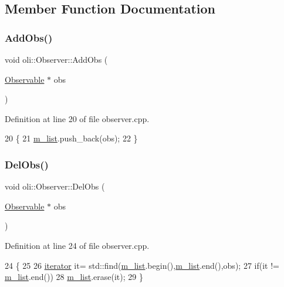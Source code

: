 \subsection{Member Function Documentation}
\hypertarget{classoli_1_1_observer_a3d6dbe2f29de6f9aa33fcabe7d42d90c}{}\label{classoli_1_1_observer_a3d6dbe2f29de6f9aa33fcabe7d42d90c} 
\subsubsection{\texorpdfstring{Add\+Obs()}{AddObs()}}
{\footnotesize\ttfamily void oli\+::\+Observer\+::\+Add\+Obs (\begin{DoxyParamCaption}\item[{\hyperlink{classoli_1_1_observable}{Observable} $\ast$}]{obs }\end{DoxyParamCaption})}



Definition at line 20 of file observer.\+cpp.


\begin{DoxyCode}
20                                      \{
21     \hyperlink{classoli_1_1_observer_acf615598b1c72e779d12c8b9b9422c86}{m\_list}.push\_back(obs);
22 \}
\end{DoxyCode}
\hypertarget{classoli_1_1_observer_af34e52ebb941e7be3c1f1decd4299548}{}\label{classoli_1_1_observer_af34e52ebb941e7be3c1f1decd4299548} 
\subsubsection{\texorpdfstring{Del\+Obs()}{DelObs()}}
{\footnotesize\ttfamily void oli\+::\+Observer\+::\+Del\+Obs (\begin{DoxyParamCaption}\item[{\hyperlink{classoli_1_1_observable}{Observable} $\ast$}]{obs }\end{DoxyParamCaption})}



Definition at line 24 of file observer.\+cpp.


\begin{DoxyCode}
24                                     \{
25 
26     \hyperlink{classoli_1_1_observer_a845b9aed78746c4f413cdeae346ca1b3}{iterator} it= std::find(\hyperlink{classoli_1_1_observer_acf615598b1c72e779d12c8b9b9422c86}{m\_list}.begin(),\hyperlink{classoli_1_1_observer_acf615598b1c72e779d12c8b9b9422c86}{m\_list}.end(),obs);
27     \textcolor{keywordflow}{if}(it != \hyperlink{classoli_1_1_observer_acf615598b1c72e779d12c8b9b9422c86}{m\_list}.end())
28         \hyperlink{classoli_1_1_observer_acf615598b1c72e779d12c8b9b9422c86}{m\_list}.erase(it);
29 \}
\end{DoxyCode}
\hypertarget{classoli_1_1_observer_a81154a42166f88a6e341909438a07b75}{}\label{classoli_1_1_observer_a81154a42166f88a6e341909438a07b75} 
